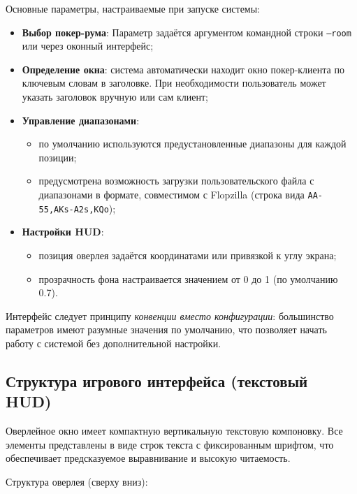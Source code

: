 Основные параметры, настраиваемые при запуске системы:

\begin{itemize}
    \item \textbf{Выбор покер-рума}: Параметр задаётся аргументом командной строки \texttt{--room} или через оконный интерфейс;
    
    \item \textbf{Определение окна}: система автоматически находит окно покер-клиента по ключевым словам в заголовке. При необходимости пользователь может указать заголовок вручную или сам клиент;
    
    \item \textbf{Управление диапазонами}: 
    \begin{itemize}
        \item по умолчанию используются предустановленные диапазоны для каждой позиции;
        \item предусмотрена возможность загрузки пользовательского файла с диапазонами в формате, совместимом с Flopzilla (строка вида \texttt{AA-55,AKs-A2s,KQo});
    \end{itemize}
    
    \item \textbf{Настройки HUD}:
    \begin{itemize}
        \item позиция оверлея задаётся координатами или привязкой к углу экрана;
        \item прозрачность фона настраивается значением от 0 до 1 (по умолчанию 0.7).
    \end{itemize}
\end{itemize}

Интерфейс следует принципу \textit{конвенции вместо конфигурации}: большинство параметров имеют разумные значения по умолчанию, что позволяет начать работу с системой без дополнительной настройки.

\subsection{Структура игрового интерфейса (текстовый HUD)}

Оверлейное окно имеет компактную вертикальную текстовую компоновку. Все элементы представлены в виде строк текста с фиксированным шрифтом, что обеспечивает предсказуемое выравнивание и высокую читаемость.

Структура оверлея (сверху вниз):


